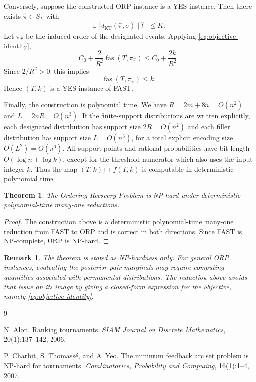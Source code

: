 \documentclass[11pt]{article}
\newtheorem{theorem}{Theorem}
\newtheorem{remark}{Remark}
\newcommand{\E}{\mathbb{E}}
\newcommand{\KT}{\operatorname{KT}}
\newcommand{\fas}{\operatorname{fas}}
\begin{document}
Conversely, suppose the constructed ORP instance is a YES instance.  Then there exists $\hat\pi\in S_L$ with
\begin{equation}
  \E\left[d_{\KT}(\hat\pi,\sigma)\mid \hat t\right]\le K.
\end{equation}
Let $\pi_{\hat\pi}$ be the induced order of the designated events.  Applying \eqref{eq:objective-identity},
\begin{equation}
  C_0+\frac2{R^2}\fas(T,\pi_{\hat\pi})
  \le C_0+\frac{2k}{R^2}.
\end{equation}
Since $2/R^2>0$, this implies
\begin{equation}
  \fas(T,\pi_{\hat\pi})\le k.
\end{equation}
Hence $(T,k)$ is a YES instance of FAST.

Finally, the construction is polynomial time.  We have $R=2m+8n=O(n^2)$ and $L=2nR=O(n^3)$.  If the finite-support distributions are written explicitly, each designated distribution has support size $2R=O(n^2)$ and each filler distribution has support size $L=O(n^3)$, for a total explicit encoding size $O(L^2)=O(n^6)$.  All support points and rational probabilities have bit-length $O(\log n+\log k)$, except for the threshold numerator which also uses the input integer $k$.  Thus the map $(T,k)\mapsto f(T,k)$ is computable in deterministic polynomial time.

\begin{theorem}
The Ordering Recovery Problem is NP-hard under deterministic polynomial-time many-one reductions.
\end{theorem}

\begin{proof}
The construction above is a deterministic polynomial-time many-one reduction from FAST to ORP and is correct in both directions.  Since FAST is NP-complete, ORP is NP-hard.
\end{proof}

\begin{remark}
The theorem is stated as NP-hardness only.  For general ORP instances, evaluating the posterior pair marginals may require computing quantities associated with permanental distributions.  The reduction above avoids that issue on its image by giving a closed-form expression for the objective, namely \eqref{eq:objective-identity}.
\end{remark}

\begin{thebibliography}{9}

N. Alon.
\newblock Ranking tournaments.
\newblock \emph{SIAM Journal on Discrete Mathematics}, 20(1):137--142, 2006.

P. Charbit, S. Thomass\'e, and A. Yeo.
\newblock The minimum feedback arc set problem is NP-hard for tournaments.
\newblock \emph{Combinatorics, Probability and Computing}, 16(1):1--4, 2007.

\end{thebibliography}
\end{document}
